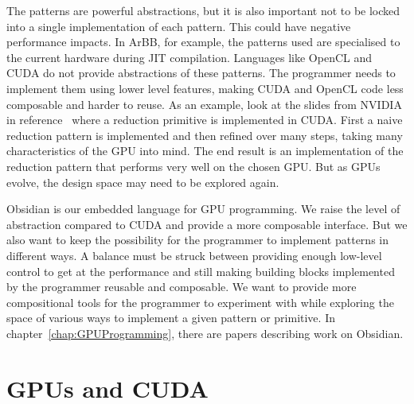 \documentclass[a4paper]{book}
\begin{document}
The patterns are powerful abstractions, but it is also important not to be locked into 
a single implementation of each pattern. This could have negative performance impacts. 
In ArBB, for example, the patterns used are specialised to the current hardware during JIT 
compilation. Languages like OpenCL and CUDA do not provide abstractions of these patterns. 
The programmer needs to implement them using lower level features, making CUDA and OpenCL 
code less composable and harder to reuse. As an example, look at the slides from NVIDIA in 
reference~\citet{reduction} where a reduction primitive is implemented in CUDA. First a 
naive reduction pattern is implemented and then refined over many steps, taking many 
characteristics of the GPU into mind. The end result is an implementation of the 
reduction pattern that performs very well on the chosen GPU. But as GPUs evolve, the 
design space may need to be explored again. 

Obsidian is our embedded language for GPU programming. We raise the level of abstraction 
compared to CUDA and provide a more composable interface. But we also want to keep 
the possibility for the programmer to implement patterns in different ways. A balance 
must be struck between providing enough low-level control to get at the performance 
and still making building blocks implemented by the programmer reusable and composable. 
We want to provide more compositional tools for the programmer to experiment with while 
exploring the space of various ways to implement a given pattern or primitive. 
In chapter~\ref{chap:GPUProgramming}, there are papers describing work on Obsidian. 



%
%
\section{GPUs and CUDA} 
\end{document}
